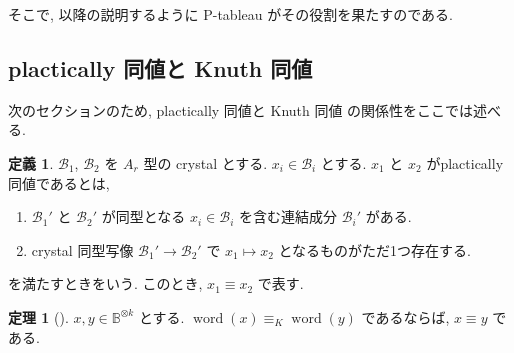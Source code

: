 \documentclass[
  a4paper, 
  12pt,
  ja=standard,
  xelatex,
  left=30truemm,
  right=30truemm,
  titlepage 
]{bxjsarticle}
\theoremstyle{definition}
\newtheorem{df}{定義}[section]
\newtheorem{thm}{定理}[section]
\begin{document}
そこで, 以降の説明するように P-tableau がその役割を果たすのである.

\subsection{plactically 同値と Knuth 同値}
次のセクションのため, plactically 同値と Knuth 同値 の関係性をここでは述べる.

\begin{df}
  $\mathcal{B}_1$, $\mathcal{B}_2$ を $A_r$ 型の crystal とする.
  $x_i \in \mathcal{B}_i$ とする.
  $x_1$ と $x_2$ がplactically 同値であるとは,
  \begin{enumerate}
    \item $\mathcal{B}_1 '$ と $\mathcal{B}_2 '$ が同型となる $x_i \in \mathcal{B}_i$ を含む連結成分 $\mathcal{B}_i '$ がある.
    \item crystal 同型写像 $\mathcal{B}_1 ' \to \mathcal{B}_2 '$ で $x_1 \mapsto x_2$ となるものがただ1つ存在する.
  \end{enumerate}
  を満たすときをいう. このとき, $x_1 \equiv x_2$ で表す.
\end{df}

\begin{thm} [{\cite[定理8.4]{b2}}] \label{k-plactically-equiv}
  $x, y \in \mathbb{B}^{\otimes k}$ とする.
  $\operatorname{word}(x) \equiv_{K} \operatorname{word}(y)$ であるならば, $x \equiv y$ である.
\end{thm}
\end{document}
